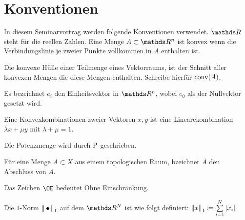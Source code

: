 
\section*{Konventionen}

In diesem Seminarvortrag werden folgende Konventionen verwendet.
$\R$ steht für die reellen Zahlen. Eine Menge $A \subset \R^n$ ist konvex
wenn die Verbindungslinie je zweier Punkte vollkommen in $A$ enthalten ist.

Die konvexe Hülle einer Teilmenge eines Vektorraums, ist der Schnitt
aller konvexen Mengen die diese Mengen enthalten. Schreibe hierfür $\conv(A)$.

Es bezeichnet $e_i$ den Einheitsvektor in $\R^n$, wobei $e_0$ als der Nullvektor gesetzt wird.

Eine Konvexkombinationen zweier Vektoren $x,y$ ist eine Linearekombination $\lambda x + \mu y$ mit $\lambda + \mu = 1$.

Die Potenzmenge wird durch $\pow$ geschrieben.

Für eine Menge $A \subset X$ aus einem topologischen Raum, bzeichnet
$\overline{A}$ den Abschluss von $A$.

Das Zeichen $\OE$ bedeutet Ohne Einschränkung.

Die $1$-Norm $\nn_1$ auf dem $\R^N$ ist wie folgt definiert:
$\nn[x]_1 \coloneqq \sp{1}{N} |x_i|$.



